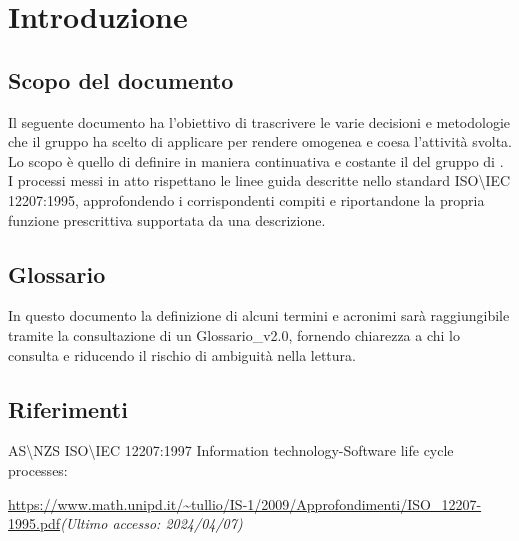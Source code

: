\chapter{Introduzione}

\section{Scopo del documento}
Il seguente documento ha l'obiettivo di trascrivere le varie decisioni e metodologie che il gruppo ha scelto di applicare per rendere omogenea e coesa l'attività svolta. Lo scopo è quello di definire in maniera continuativa e costante il  del gruppo di .\\
I processi messi in atto rispettano le linee guida descritte nello standard ISO\textbackslash IEC 12207:1995, approfondendo i corrispondenti compiti e riportandone la propria funzione prescrittiva supportata da una descrizione.

\section{Glossario}
In questo documento la definizione di alcuni termini e acronimi sarà raggiungibile tramite la consultazione di un Glossario\_v2.0, fornendo chiarezza a chi lo consulta e riducendo il rischio di ambiguità nella lettura.

\section{Riferimenti}
AS\textbackslash NZS ISO\textbackslash IEC 12207:1997 Information technology-Software life cycle processes:\\
\begin{footnotesize}
    \url{https://www.math.unipd.it/~tullio/IS-1/2009/Approfondimenti/ISO_12207-1995.pdf}\textit{(Ultimo accesso: 2024/04/07)}
\end{footnotesize}
